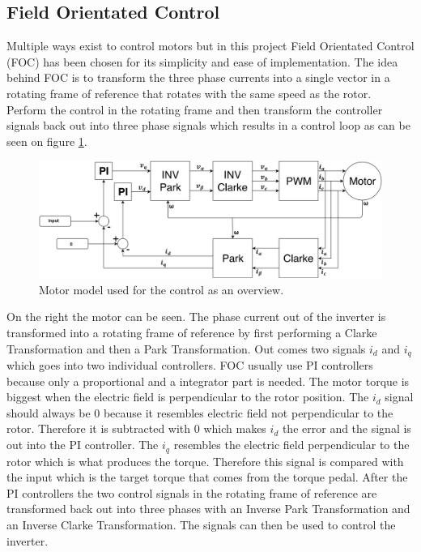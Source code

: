 

\subsection{Field Orientated Control}
Multiple ways exist to control motors but in this project Field Orientated Control (FOC) has been chosen for its simplicity and ease of implementation. The idea behind FOC is to transform the three phase currents into a single vector in a rotating frame of reference that rotates with the same speed as the rotor. 
Perform the control in the rotating frame and then transform the controller signals back out into three phase signals which results in a control loop as can be seen on figure \ref{fig:Motor_model}.

\begin{figure} [H]
    \centering
    \includegraphics[scale=0.42]{pictures/control/udklip.PNG}
    \caption{Motor model used for the control as an overview.}
    \label{fig:Motor_model}
\end{figure} 

On the right the motor can be seen. The phase current out of the inverter is transformed into a rotating frame of reference by first performing a Clarke Transformation and then a Park Transformation. Out comes two signals $i_d$ and $i_q$ which goes into two individual controllers. FOC usually use PI controllers because only a proportional and a integrator part is needed. The motor torque is biggest when the electric field is perpendicular to the rotor position. The $i_d$ signal should always be $0$ because it resembles electric field not perpendicular to the rotor. Therefore it is subtracted with $0$ which makes $i_d$ the error and the signal is out into the PI controller. The $i_q$ resembles the electric field perpendicular to the rotor which is what produces the torque. Therefore this signal is compared with the input which is the target torque that comes from the torque pedal. After the PI controllers the two control signals in the rotating frame of reference are transformed back out into three phases with an Inverse Park Transformation and an Inverse Clarke Transformation. The signals can then be used to control the inverter.


